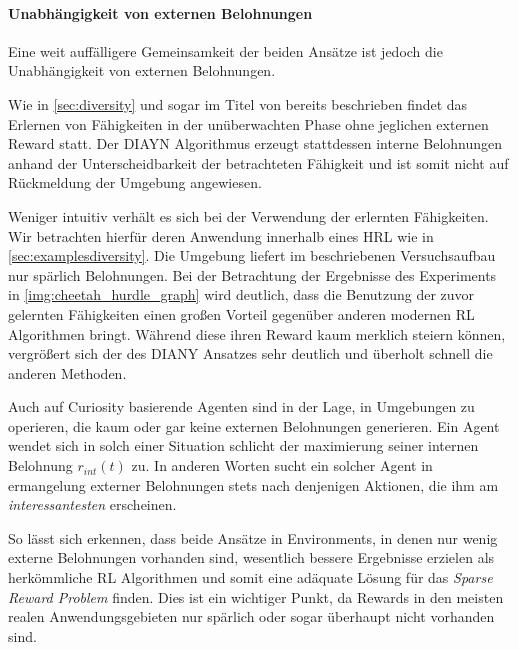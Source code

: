 
\paragraph{Unabhängigkeit von externen Belohnungen}
Eine weit auffälligere Gemeinsamkeit der beiden Ansätze ist jedoch die Unabhängigkeit von externen Belohnungen.

Wie in \ref{sec:diversity} und sogar im Titel von \cite{diversity_eysenbach} bereits beschrieben findet das Erlernen von Fähigkeiten in der unüberwachten Phase ohne jeglichen externen Reward statt. Der DIAYN Algorithmus erzeugt stattdessen interne Belohnungen anhand der Unterscheidbarkeit der betrachteten Fähigkeit und ist somit nicht auf Rückmeldung der Umgebung angewiesen.

Weniger intuitiv verhält es sich bei der Verwendung der erlernten Fähigkeiten. Wir betrachten hierfür deren Anwendung innerhalb eines HRL wie in \ref{sec:examplesdiversity}. Die Umgebung liefert im beschriebenen Versuchsaufbau nur spärlich Belohnungen. Bei der Betrachtung der Ergebnisse des Experiments in \ref{img:cheetah_hurdle_graph} wird deutlich, dass die Benutzung der zuvor gelernten Fähigkeiten einen großen Vorteil gegenüber anderen modernen RL Algorithmen bringt. Während diese ihren Reward kaum merklich steiern können, vergrößert sich der des DIANY Ansatzes sehr deutlich und überholt schnell die anderen Methoden.

Auch auf Curiosity basierende Agenten sind in der Lage, in Umgebungen zu operieren, die kaum oder gar keine externen Belohnungen generieren. Ein Agent wendet sich in solch einer Situation schlicht der maximierung seiner internen Belohnung \(r_{int}(t)\) zu. In anderen Worten sucht ein solcher Agent in ermangelung externer Belohnungen stets nach denjenigen Aktionen, die ihm am \emph{interessantesten} erscheinen.

So lässt sich erkennen, dass beide Ansätze in Environments, in denen nur wenig externe Belohnungen vorhanden sind, wesentlich bessere Ergebnisse erzielen als herkömmliche RL Algorithmen und somit eine adäquate Lösung für das \emph{Sparse Reward Problem} finden. Dies ist ein wichtiger Punkt, da Rewards in den meisten realen Anwendungsgebieten nur spärlich oder sogar überhaupt nicht vorhanden sind.

